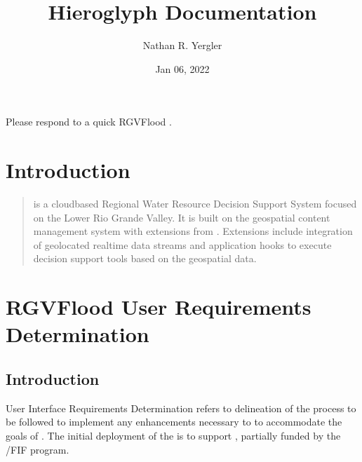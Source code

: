 \documentclass[letterpaper,10pt,english]{sphinxmanual}
\title{Hieroglyph Documentation}
\date{Jan 06, 2022}
\author{Nathan R. Yergler}
\begin{document}
\pagestyle{empty}
\sphinxmaketitle
\pagestyle{plain}
\sphinxtableofcontents
\pagestyle{normal}
\label{\detokenize{index::doc}}


\sphinxAtStartPar
Please respond to a quick RGVFlood .


\chapter{Introduction}
\label{\detokenize{introduction:introduction}}\label{\detokenize{introduction::doc}}\begin{quote}

\sphinxAtStartPar
{\hyperref[\detokenize{glossary:term-RGVFlood}]{}} is a cloud\sphinxhyphen{}based Regional Water Resource Decision Support System focused on the Lower Rio Grande Valley. It is built on the  geospatial content management system with extensions from . {\hyperref[\detokenize{glossary:term-REON}]{}} Extensions  include integration of geolocated real\sphinxhyphen{}time data streams and application hooks to execute decision support tools based on the geospatial data.
\end{quote}


\chapter{RGVFlood User Requirements Determination}
\label{\detokenize{requirements/index:rgvflood-user-requirements-determination}}\label{\detokenize{requirements/index::doc}}

\section{Introduction}
\label{\detokenize{requirements/introduction/index:introduction}}\label{\detokenize{requirements/introduction/index::doc}}
\sphinxAtStartPar
User Interface Requirements Determination refers to delineation of the process to be followed to implement any enhancements necessary to {\hyperref[\detokenize{glossary:term-REON.cc}]{}} to accommodate the goals of {\hyperref[\detokenize{glossary:term-REON-WM}]{}}. The initial deployment of the {\hyperref[\detokenize{glossary:term-REON-WM}]{}} is to support {\hyperref[\detokenize{glossary:term-RGVFlood}]{}}, partially funded by the {\hyperref[\detokenize{glossary:term-TWDB}]{}}/FIF program.
\end{document}
